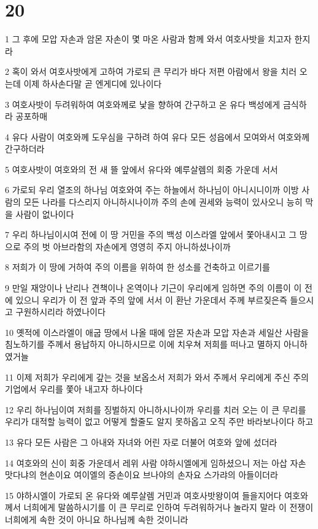 \chapter{20}

\par 1 그 후에 모압 자손과 암몬 자손이 몇 마온 사람과 함께 와서 여호사밧을 치고자 한지라
\par 2 혹이 와서 여호사밧에게 고하여 가로되 큰 무리가 바다 저편 아람에서 왕을 치러 오는데 이제 하사손다말 곧 엔게디에 있나이다
\par 3 여호사밧이 두려워하여 여호와께로 낯을 향하여 간구하고 온 유다 백성에게 금식하라 공포하매
\par 4 유다 사람이 여호와께 도우심을 구하려 하여 유다 모든 성읍에서 모여와서 여호와께 간구하더라
\par 5 여호사밧이 여호와의 전 새 뜰 앞에서 유다와 예루살렘의 회중 가운데 서서
\par 6 가로되 우리 열조의 하나님 여호와여 주는 하늘에서 하나님이 아니시니이까 이방 사람의 모든 나라를 다스리지 아니하시나이까 주의 손에 권세와 능력이 있사오니 능히 막을 사람이 없나이다
\par 7 우리 하나님이시여 전에 이 땅 거민을 주의 백성 이스라엘 앞에서 쫓아내시고 그 땅으로 주의 벗 아브라함의 자손에게 영영히 주지 아니하셨나이까
\par 8 저희가 이 땅에 거하여 주의 이름을 위하여 한 성소를 건축하고 이르기를
\par 9 만일 재앙이나 난리나 견책이나 온역이나 기근이 우리에게 임하면 주의 이름이 이 전에 있으니 우리가 이 전 앞과 주의 앞에 서서 이 환난 가운데서 주께 부르짖은즉 들으시고 구원하시리라 하였나이다
\par 10 옛적에 이스라엘이 애굽 땅에서 나올 때에 암몬 자손과 모압 자손과 세일산 사람을 침노하기를 주께서 용납하지 아니하시므로 이에 치우쳐 저희를 떠나고 멸하지 아니하였거늘
\par 11 이제 저희가 우리에게 갚는 것을 보옵소서 저희가 와서 주께서 우리에게 주신 주의 기업에서 우리를 쫓아 내고자 하나이다
\par 12 우리 하나님이여 저희를 징벌하지 아니하시나이까 우리를 치러 오는 이 큰 무리를 우리가 대적할 능력이 없고 어떻게 할줄도 알지 못하옵고 오직 주만 바라보나이다 하고
\par 13 유다 모든 사람은 그 아내와 자녀와 어린 자로 더불어 여호와 앞에 섰더라
\par 14 여호와의 신이 회중 가운데서 레위 사람 야하시엘에게 임하셨으니 저는 아삽 자손 맛다냐의 현손이요 여이엘의 증손이요 브나야의 손자요 스가랴의 아들이더라
\par 15 야하시엘이 가로되 온 유다와 예루살렘 거민과 여호사밧왕이여 들을지어다 여호와께서 너희에게 말씀하시기를 이 큰 무리로 인하여 두려워하거나 놀라지 말라 이 전쟁이 너희에게 속한 것이 아니요 하나님께 속한 것이니라
